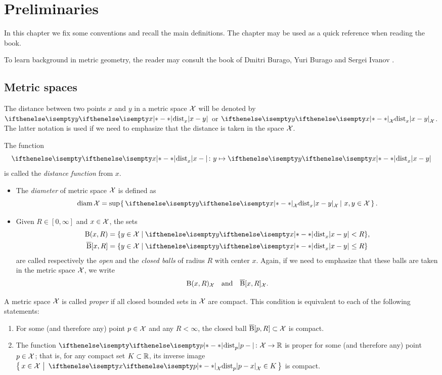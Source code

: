 \chapter{Preliminaries}

In this chapter we fix some conventions and recall the main definitions.
The chapter may be used as a quick reference when reading the book.

To learn background in metric geometry, the reader  may consult the book of Dmitri Burago, Yuri Burago and Sergei Ivanov \cite{BBI}.
 

\section{Metric spaces}
\label{sec:metric spaces}


The distance between two points $x$ and $y$ in a metric space $\mathcal{X}$ will be denoted by $\dist{x}{y}{}$ or $\dist{x}{y}{\spc{X}}$.
The latter notation is used if we need to emphasize 
that the distance is taken in the space ${\mathcal{X}}$.

The function 
\[\dist{x}{}{}\:y\mapsto \dist{x}{y}{}\]
is called the \emph{distance function} from $x$. 

\begin{itemize}
\item The \emph{diameter} of metric space $\mathcal{X}$ is defined as
\[\diam \spc{X}=\sup\set{\dist{x}{y}{\spc{X}}}{x,y\in \spc{X}}.\]

\item Given $R\in[0,\infty]$ and $x\in \spc{X}$, the sets
\begin{align*}
\oBall(x,R)&=\{y\in \spc{X}\mid \dist{x}{y}{}<R\},
\\
\cBall[x,R]&=\{y\in \spc{X}\mid \dist{x}{y}{}\le R\}
\end{align*}
are called respectively the  \emph{open} and  the \emph{closed  balls}   of radius $R$ with center $x$.
Again, if we need to emphasize that these balls are taken in the metric space $\mathcal{X}$,
we write 
\[\mathrm{B}{}(x,R)_{\mathcal{X}}\quad\text{and}\quad\overline{\mathrm{B}}{}[x,R]_{\mathcal{X}}.\]
\end{itemize}

A metric space $\mathcal{X}$ is called \emph{proper} if all closed bounded sets in $\mathcal{X}$ are compact. 
This condition is equivalent to each of the following statements:
\begin{enumerate}
\item For some (and therefore any) point $p\in \spc{X}$ and any $R<\infty$, 
the closed ball $\cBall[p,R]\subset\spc{X}$ is compact. 
\item The function $\dist{p}{}{}\:\spc{X}\to\RR$ is proper for some (and therefore any) point $p\in \spc{X}$;
that is, for any compact set $K\subset \RR$, its inverse image 
$\set{x\in \spc{X}}{\dist{p}{x}{\spc{X}}\in K}$
is compact.
\end{enumerate}

